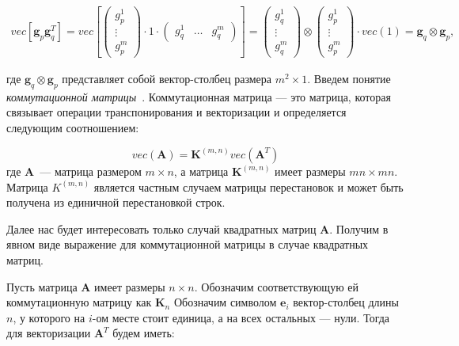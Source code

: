 \begin{gather}
    vec[\mathbf{g}_p \mathbf{g}_q^T] = vec\left[
        \begin{pmatrix}
            g_p^1 \\
            \vdots \\
            g_p^m
        \end{pmatrix}
    \cdot 1 \cdot
    \begin{pmatrix}
        g_q^1 & \dots & g_q^m
    \end{pmatrix}
    \right] = %
    \begin{pmatrix}
        g_q^1 \\
        \vdots \\
        g_q^m
    \end{pmatrix}
    \otimes
    \begin{pmatrix}
        g_p^1 \\
        \vdots \\
        g_p^m
    \end{pmatrix}
    \cdot
    vec(1) =
    \mathbf{g}_q \otimes \mathbf{g}_p,
\end{gather}


где $\mathbf{g}_q \otimes \mathbf{g}_p$ представляет собой вектор-столбец размера $m^2 \times 1$.
Введем понятие \emph{коммутационной матрицы}~\cite{neudecker}.
Коммутационная матрица --- это матрица, которая связывает операции транспонирования и векторизации
и определяется следующим соотношением:

\begin{equation}
    vec(\mathbf{A}) = \mathbf{K}^{(m,n)} vec(\mathbf{A}^T)
    \label{eq:commutation_matrix_def}
\end{equation}
где $\mathbf{A}$~--- матрица размером $m \times n$, а матрица $\mathbf{K}^{(m,n)}$ имеет размеры
$mn \times mn$.
Матрица $K^{(m,n)}$ является частным случаем матрицы перестановок и
может быть получена из единичной перестановкой строк.

Далее нас будет интересовать только случай квадратных матриц $\mathbf{A}$.
Получим в явном виде выражение для коммутационной матрицы в случае квадратных матриц.

Пусть матрица $\mathbf{A}$ имеет размеры $n \times n$. Обозначим соответствующую ей коммутационную матрицу
как $\mathbf{K}_n$
Обозначим символом $\mathbf{e}_i$ вектор-столбец длины $n$, у которого на $i$-ом месте стоит
единица, а на всех остальных --- нули. Тогда для векторизации $\mathbf{A}^T$ будем иметь:

